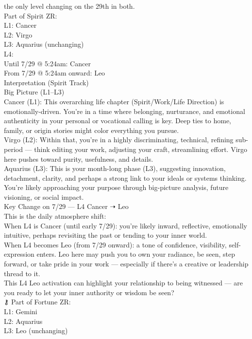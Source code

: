 \documentclass{article}
\begin{document}
the only level changing on the 29th in both.\\
 Part of Spirit ZR:\\
L1: Cancer\\
L2: Virgo\\
L3: Aquarius (unchanging)\\
L4:\\
Until 7/29 @ 5:24am: Cancer\\
From 7/29 @ 5:24am onward: Leo\\
 Interpretation (Spirit Track)\\
Big Picture (L1--L3)\\
Cancer (L1): This overarching life chapter (Spirit/Work/Life Direction)
is emotionally-driven. You're in a time where belonging, nurturance, and
emotional authenticity in your personal or vocational calling is key.
Deep ties to home, family, or origin stories might color everything you
pursue.\\
Virgo (L2): Within that, you're in a highly discriminating, technical,
refining sub-period --- think editing your work, adjusting your craft,
streamlining effort. Virgo here pushes toward purity, usefulness, and
details.\\
Aquarius (L3): This is your month-long phase (L3), suggesting
innovation, detachment, clarity, and perhaps a strong link to your
ideals or systems thinking. You're likely approaching your purpose
through big-picture analysis, future visioning, or social impact.\\
Key Change on 7/29 --- L4 Cancer ➝ Leo\\
This is the daily atmosphere shift:\\
When L4 is Cancer (until early 7/29): you're likely inward, reflective,
emotionally intuitive, perhaps revisiting the past or tending to your
inner world.\\
When L4 becomes Leo (from 7/29 onward): a tone of confidence,
visibility, self-expression enters. Leo here may push you to own your
radiance, be seen, step forward, or take pride in your work ---
especially if there's a creative or leadership thread to it.\\
This L4 Leo activation can highlight your relationship to being
witnessed --- are you ready to let your inner authority or wisdom be
seen?\\
⚷ Part of Fortune ZR:\\
L1: Gemini\\
L2: Aquarius\\
L3: Leo (unchanging)\\
\end{document}
